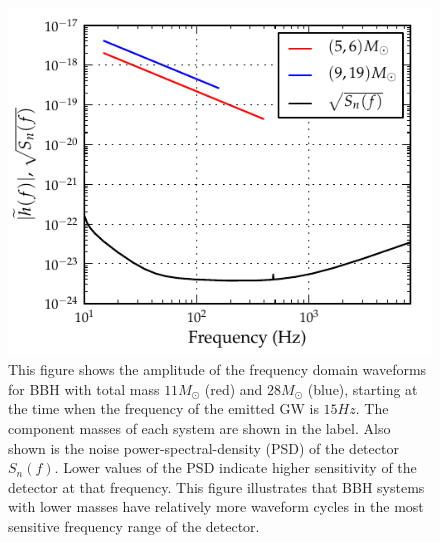 \documentclass[aps,
prd,
amsmath,
amssymb,
twocolumn,
floatfix,
groupedaddress]{revtex4-1}
\begin{document}
\begin{figure}
\centering
\includegraphics[scale=0.04, clip=false, totalheight=0.3\textheight, width=\columnwidth]{fd_fd_psd.pdf}
\caption{\label{fig:F2waveformsM}This figure shows the amplitude of the frequency domain waveforms for BBH with total mass $11M_{\odot}$ (red) and $28M_{\odot}$ (blue), starting at the time when the frequency of the emitted GW is $15Hz$. The component masses of each system are shown in the label. Also shown is the noise power-spectral-density (PSD) of the detector $S_n(f)$. Lower values of the PSD indicate higher sensitivity of the detector at that frequency. This figure illustrates that BBH systems with lower masses have relatively more waveform cycles in the most sensitive frequency range of the detector.}
\end{figure}
\end{document}
